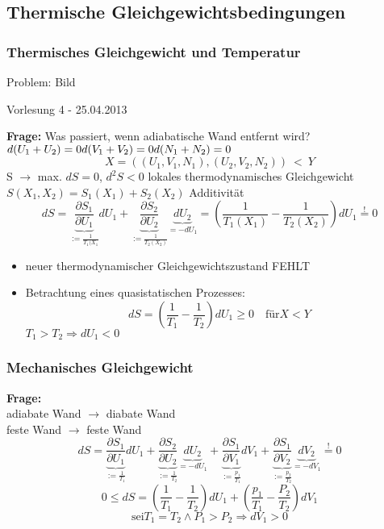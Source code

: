 \documentclass[10pt,article,colorback,accentcolor=tud9d]{scrartcl}
\begin{document}
\begin{fleqn}
\subsection{Thermische Gleichgewichtsbedingungen}
\subsubsection{Thermisches Gleichgewicht und Temperatur}
Problem: Bild
\begin{flushright}
Vorlesung 4 - 25.04.2013
\end{flushright}
\textbf{Frage:} Was passiert, wenn adiabatische Wand entfernt wird?
$d(U_1+U_2)=0\\
d(V_1+V_2)=0\\
d(N_1+N_2)=0$
\begin{equation}
X=\left((U_1,V_1,N_1),(U_2,V_2,N_2)\right) \ < \ Y
\end{equation}
S $\rightarrow$ max.  $dS=0$, $d^2S<0$ lokales thermodynamisches Gleichgewicht\\
$S(X_1,X_2)=S_1(X_1)+S_2(X_2)$  Additivität
\begin{equation}
dS=\underbrace{\frac{\partial S_1}{\partial U_1}}_{:=\frac{1}{T_1(X_1}}dU_1 +\underbrace{\frac{\partial S_2}{\partial U_2}}_{:=\frac{1}{T_2(X_2)}}\underbrace{dU_2}_{=-dU_1} = \left(\frac{1}{T_1(X_1)}-\frac{1}{T_2(X_2)}\right)dU_1 \stackrel{!}{=} 0
\end{equation}
\begin{itemize}
  \item neuer thermodynamischer Gleichgewichtszustand  FEHLT
  \item Betrachtung eines quasistatischen Prozesses:
    \begin{equation}
    dS=\left(\frac{1}{T_1}-\frac{1}{T_2}\right)dU_1 \geq 0 \quad \text{für} X<Y
    \end{equation}
    $T_1>T_2 \Rightarrow dU_1<0$
\end{itemize}
\subsubsection{Mechanisches Gleichgewicht}
\textbf{Frage:}\\
 adiabate Wand $\rightarrow$ diabate Wand\\
 feste Wand $\rightarrow$ feste Wand
\begin{equation}
  dS=\underbrace{\frac{\partial S_1}{\partial U_1}}_{:=\frac{1}{T_1}}dU_1 + \underbrace{\frac{\partial S_2}{\partial U_2}}_{:=\frac{1  }{T_2}}\underbrace{dU_2}_{=-dU_1} +\underbrace{\frac{\partial S_1}{\partial V_1}}_{:=\frac{p_1}{T_1}}dV_1 +
  \underbrace{\frac{\partial S_1}{\partial V_2}}_{:=\frac{p_2}{T_2}}\underbrace{dV_2}_{=-dV_1}\stackrel{!}{=}0
\end{equation}
\begin{equation}
0\leq dS=\left(\frac{1}{T_1}-\frac{1}{T_2}\right)dU_1 +\left(\frac{p_1}{T_1}-\frac{P_2}{T_2}\right)dV_1
\end{equation}
\begin{equation}
\text{sei} T_1=T_2 \wedge P_1 >P_2 \Rightarrow dV_1>0
\end{equation}

\end{fleqn}
\end{document}
